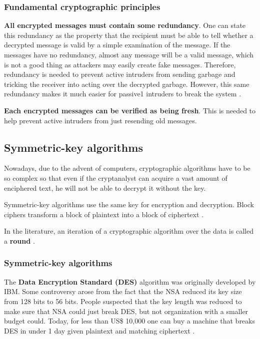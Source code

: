 \documentclass[12pt, oneside]{book}
\begin{document}
\subsubsection{Fundamental cryptographic principles}

\textbf{All encrypted messages must contain some redundancy}.
One can state this redundancy as the property that the recipient must be able to tell whether a decrypted message is valid by a simple examination of the message.
If the messages have no redundancy, almost any message will be a valid message, which is not a good thing as attackers may easily create fake messages.
Therefore, redundancy is needed to prevent active intruders from sending garbage and tricking the receiver into acting over the decrypted garbage.
However, this same redundancy makes it much easier for passive1 intruders to break the system \cite[p.~778]{computer-networks-tanenbaum-2012}.


\textbf{Each encrypted messages can be verified as being fresh}. This is needed to help prevent active intruders from just resending old messages.

\subsection{Symmetric-key algorithms}

Nowadays, due to the advent of computers, cryptographic algorithms have to be so complex so that even if the cryptanalyst can acquire a vast amount of enciphered text, he will not be able to decrypt it without the key.

Symmetric-key algorithms use the same key for encryption and decryption. Block ciphers transform a block of plaintext into a block of ciphertext \cite[p.~779]{computer-networks-tanenbaum-2012}.

In the literature, an iteration of a cryptographic algorithm over the data is called a \textbf{round} \cite[p.~780]{computer-networks-tanenbaum-2012}.

\subsubsection{Symmetric-key algorithms}

The \textbf{Data Encryption Standard (DES)} algorithm was originally developed by IBM.
Some controversy arose from the fact that the NSA reduced its key size from 128 bits to 56 bits.
People suspected that the key length was reduced to make sure that NSA could just break DES, but not organization with a smaller budget could.
Today, for less than US\$ 10,000 one can buy a machine that breaks DES in under 1 day given plaintext and matching ciphertext \cite[p.~782]{computer-networks-tanenbaum-2012}.
\end{document}
